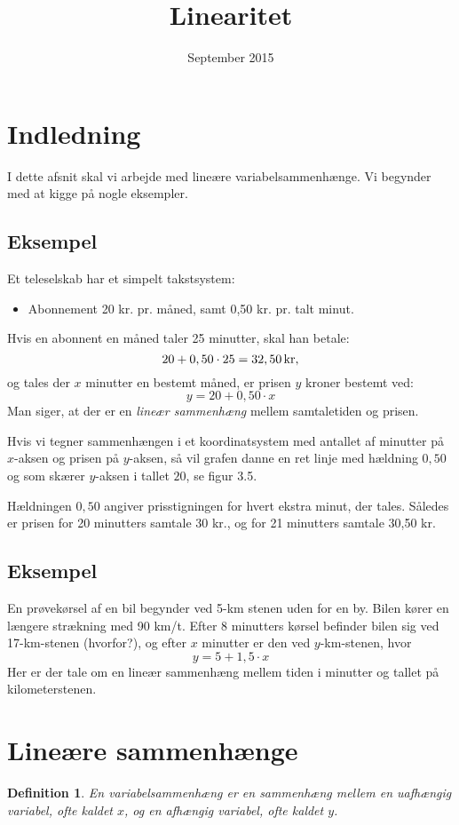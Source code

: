 \documentclass[12pt,oneside,a4paper]{article}
\title{Linearitet}
\date{September 2015}
\newtheorem{mydef}[thm]{Definition}
\begin{document}
\maketitle

\section{Indledning}
I dette afsnit skal vi arbejde med lineære variabelsammenhænge.
Vi begynder med at kigge på nogle eksempler.

\subsection{Eksempel}
Et teleselskab har et simpelt takstsystem:
\begin{itemize}
    \item Abonnement 20 kr. pr. måned, samt 0,50 kr. pr. talt minut.
\end{itemize}
Hvis en abonnent en måned taler 25 minutter, skal han betale:
$$
20 + 0,50\cdot25 = 32,50 \, {\rm kr},
$$
og tales der $x$ minutter en bestemt måned, er prisen $y$ kroner bestemt ved:
$$
y = 20 + 0,50\cdot x
$$
Man siger, at der er en {\em lineær sammenhæng} mellem samtaletiden og prisen.

Hvis vi tegner sammenhængen i et koordinatsystem med antallet af minutter på
$x$-aksen og prisen på $y$-aksen, så vil grafen danne en ret linje med hældning
$0,50$ og som skærer $y$-aksen i tallet $20$, se figur 3.5.

Hældningen $0,50$ angiver prisstigningen for hvert ekstra minut, der tales.
Således er prisen for 20 minutters samtale 30 kr., og for 21 minutters
samtale 30,50 kr.

\subsection{Eksempel}
En prøvekørsel af en bil begynder ved 5-km stenen uden for en by. Bilen kører
en længere strækning med 90 km/t. Efter 8 minutters kørsel befinder bilen sig
ved 17-km-stenen (hvorfor?), og efter $x$ minutter er den ved $y$-km-stenen,
hvor
$$
y = 5 + 1,5\cdot x
$$
Her er der tale om en lineær sammenhæng mellem tiden i minutter og tallet på
kilometerstenen.

\section{Lineære sammenhænge}
\begin{mydef}
    En variabelsammenhæng er en sammenhæng mellem en uafhængig variabel, ofte
    kaldet $x$, og en afhængig variabel, ofte kaldet $y$.
\end{mydef}
\end{document}
